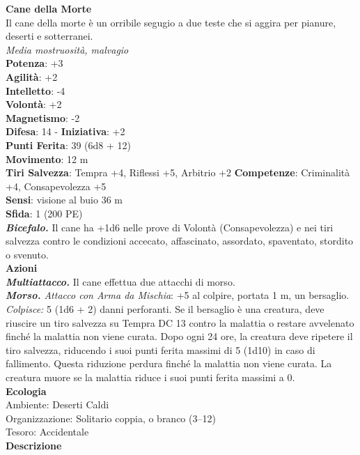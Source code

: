 \begin{multicols}{2}
\medskip\textbf{Cane della Morte}\\
Il cane della morte è un orribile segugio a due teste che si aggira per pianure, deserti e sotterranei.\\
\emph{Media mostruosità, malvagio}\\
\textbf{Potenza}: +3\\
\textbf{Agilità}: +2\\
\textbf{Intelletto}: -4\\
\textbf{Volontà}: +2\\
\textbf{Magnetismo}: -2\\
\textbf{Difesa}: 14 - \textbf{Iniziativa}: +2\\
\textbf{Punti Ferita}: 39 (6d8 + 12)\\
\textbf{Movimento}: 12 m\\
\textbf{Tiri Salvezza}: Tempra +4, Riflessi +5, Arbitrio +2 
\textbf{Competenze}: Criminalità +4, Consapevolezza +5\\
\textbf{Sensi}: visione al buio 36 m\\
\textbf{Sfida}: 1 (200 PE)\smallskip\\
\emph{\textbf{Bicefalo.}} Il cane ha +1d6 nelle prove di Volontà (Consapevolezza) e nei tiri salvezza contro le condizioni accecato, affascinato, assordato, spaventato, stordito o svenuto.\\
\smallskip\textbf{Azioni}\\
\emph{\textbf{Multiattacco.}} Il cane effettua due attacchi di morso.\\
\emph{\textbf{Morso.} Attacco con Arma da Mischia}: +5 al colpire, portata 1 m, un bersaglio.\\
\emph{Colpisce:} 5 (1d6 + 2) danni perforanti. Se il bersaglio è una creatura, deve riuscire un tiro salvezza su Tempra DC  13 contro la malattia o restare avvelenato finché la malattia non viene curata. Dopo ogni 24 ore, la creatura deve ripetere il tiro salvezza, riducendo i suoi punti ferita massimi di 5 (1d10) in caso di fallimento. Questa riduzione perdura finché la malattia non viene curata. La creatura muore se la malattia riduce i suoi punti ferita massimi a 0. \\
\textbf{Ecologia}\\
Ambiente: Deserti Caldi\\
Organizzazione: Solitario coppia, o branco (3–12)\\
Tesoro: Accidentale\\
\textbf{Descrizione}\\

\end{multicols}
